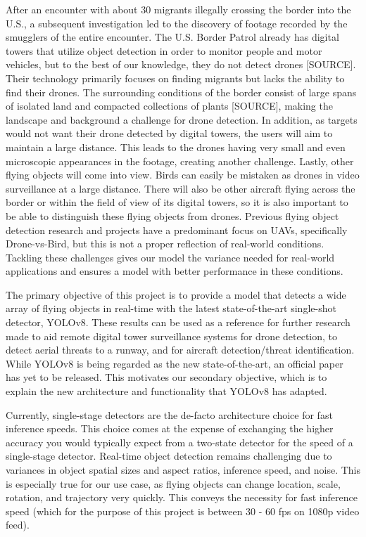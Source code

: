 \documentclass[10pt,twocolumn,letterpaper]{article}
\begin{document}
After an encounter with about 30 migrants illegally crossing the border into the U.S., a subsequent investigation led to the discovery of footage recorded by the smugglers of the entire encounter. The U.S. Border Patrol already has digital towers that utilize object detection in order to monitor people and motor vehicles, but to the best of our knowledge, they do not detect drones [SOURCE]. Their technology primarily focuses on finding migrants but lacks the ability to find their drones. The surrounding conditions of the border consist of large spans of isolated land and compacted collections of plants [SOURCE], making the landscape and background a challenge for drone detection. In addition, as targets would not want their drone detected by digital towers, the users will aim to maintain a large distance. This leads to the drones having very small and even microscopic appearances in the footage, creating another challenge. Lastly, other flying objects will come into view. Birds can easily be mistaken as drones in video surveillance at a large distance. There will also be other aircraft flying across the border or within the field of view of its digital towers, so it is also important to be able to distinguish these flying objects from drones. Previous flying object detection research and projects have a predominant focus on UAVs, specifically Drone-vs-Bird, but this is not a proper reflection of real-world conditions. Tackling these challenges gives our model the variance needed for real-world applications and ensures a model with better performance in these conditions. 

The primary objective of this project is to provide a model that detects a wide array of flying objects in real-time with the latest state-of-the-art single-shot detector, YOLOv8. These results can be used as a reference for further research made to aid remote digital tower surveillance systems for drone detection, to detect aerial threats to a runway, and for aircraft detection/threat identification. While YOLOv8 is being regarded as the new state-of-the-art, an official paper has yet to be released. This motivates our secondary objective, which is to explain the new architecture and functionality that YOLOv8 has adapted. 

Currently, single-stage detectors are the de-facto architecture choice for fast inference speeds. This choice comes at the expense of exchanging the higher accuracy you would typically expect from a two-state detector for the speed of a single-stage detector. Real-time object detection remains challenging due to variances in object spatial sizes and aspect ratios, inference speed, and noise. This is especially true for our use case, as flying objects can change location, scale, rotation, and trajectory very quickly. This conveys the necessity for fast inference speed (which for the purpose of this project is between 30 - 60 fps on 1080p video feed). 
\end{document}
